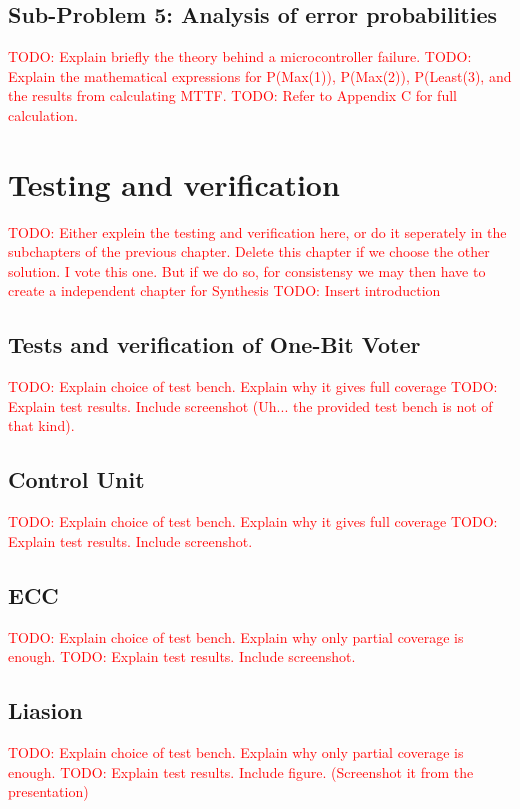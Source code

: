 \documentclass[a4paper]{IEEEtran}
\newcommand\TODO[1]{\textcolor{red}{TODO:#1}}
\newcommand\todo[1]{\TODO{#1}}
\begin{document}
\subsection{Sub-Problem 5: Analysis of error probabilities}
\todo{ Explain briefly the theory behind a microcontroller failure. }
\break
\break
\todo{ Explain the mathematical expressions for P(Max(1)), P(Max(2)), P(Least(3), and the results from calculating MTTF.}
\break
\break
\todo{ Refer to Appendix C for full calculation.}

\section{ Testing and verification }
\todo{ Either explein the testing and verification here, or do it seperately in the subchapters of the previous chapter. Delete this chapter if we choose the other solution. I vote this one. But if we do so, for consistensy we may then have to create a independent chapter for Synthesis }
\break
\break
\todo{ Insert introduction }

\subsection{ Tests and verification of One-Bit Voter}
\todo{ Explain choice of test bench. Explain why it gives full coverage}
\break
\break
\todo{ Explain test results. Include screenshot (Uh... the provided test bench is not of that kind).}

\subsection{ Control Unit}
\todo{ Explain choice of test bench. Explain why it gives full coverage}
\break
\break
\todo{ Explain test results. Include screenshot. }

\subsection{ ECC }
\todo{ Explain choice of test bench. Explain why only partial coverage is enough. }
\break
\break
\todo{ Explain test results. Include screenshot. }

\subsection{ Liasion }
\todo{ Explain choice of test bench. Explain why only partial coverage is enough. }
\break
\break
\todo{ Explain test results. Include figure. (Screenshot it from the presentation) }
\end{document}
